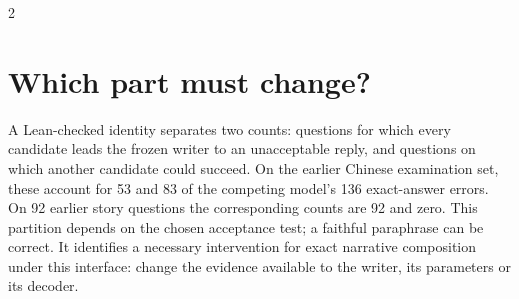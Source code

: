 \begin{multicols}{2}
\section*{Which part must change?}
A Lean-checked identity separates two counts: questions for which every candidate leads the frozen writer to an unacceptable reply, and questions on which another candidate could succeed. On the earlier Chinese examination set, these account for 53 and 83 of the competing model's 136 exact-answer errors. On 92 earlier story questions the corresponding counts are 92 and zero. This partition depends on the chosen acceptance test; a faithful paraphrase can be correct. It identifies a necessary intervention for exact narrative composition under this interface: change the evidence available to the writer, its parameters or its decoder.
\end{multicols}
\newpage

